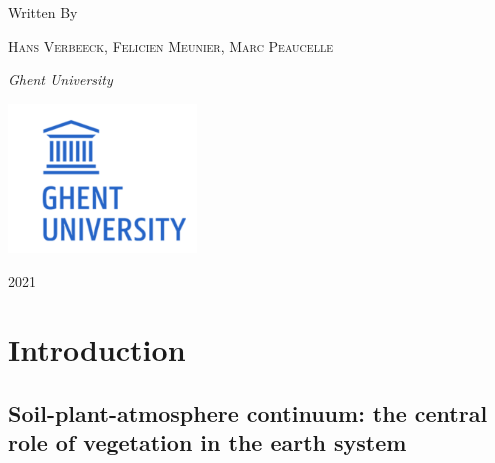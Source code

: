 \documentclass[
  oneside]{book}
\begin{document}
\begin{titlepage}
	Written By
	
	\vspace{0.5\baselineskip} %
	
	{\scshape Hans Verbeeck, Felicien Meunier, Marc Peaucelle \\} %
	
	\vspace{0.5\baselineskip} %
	
	\textit{Ghent University \\} %
	
	\vfill %
	
	
	
	\includegraphics[width = 50mm]{figures/UGhent2.png}
	
	\vspace{0.3\baselineskip} %
	
	2021 %
	

\end{titlepage}



{
\setcounter{tocdepth}{1}
\tableofcontents
}
\mainmatter

\hypertarget{intro}{%
\chapter{Introduction}\label{intro}}

\hypertarget{soil-plant-atmosphere-continuum-the-central-role-of-vegetation-in-the-earth-system}{%
\section{Soil-plant-atmosphere continuum: the central role of vegetation in the earth system}\label{soil-plant-atmosphere-continuum-the-central-role-of-vegetation-in-the-earth-system}}
\end{document}
